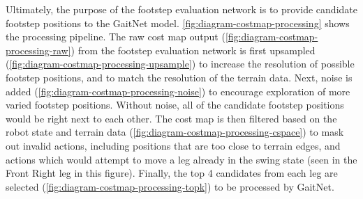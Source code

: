 Ultimately, the purpose of the footstep evaluation network is to
provide candidate footstep positions to the GaitNet model.
\autoref{fig:diagram-costmap-processing} shows the processing pipeline.
The raw cost map output (\autoref{fig:diagram-costmap-processing-raw})
from the footstep evaluation network is first upsampled
(\autoref{fig:diagram-costmap-processing-upsample}) to increase the
resolution of possible footstep positions, and to match the resolution of
the terrain data. Next, noise is added
(\autoref{fig:diagram-costmap-processing-noise}) to
encourage exploration of more varied footstep positions. Without noise,
all of the candidate footstep positions would be right next to each other.
The cost map is then filtered based on the robot state and terrain data
(\autoref{fig:diagram-costmap-processing-cspace}) to mask out
invalid actions, including positions that are too close to terrain edges,
and actions which would attempt to move a leg already in the swing state
(seen in the Front Right leg in this figure). Finally, the top 4
candidates from each leg are selected
(\autoref{fig:diagram-costmap-processing-topk})
to be processed by GaitNet.

\def\imgwidth{0.16\textwidth}
\def\xgap{2em}          %
\def\arrowwidth{1.2em}  %
\def\arrowshift{0.5em} %

